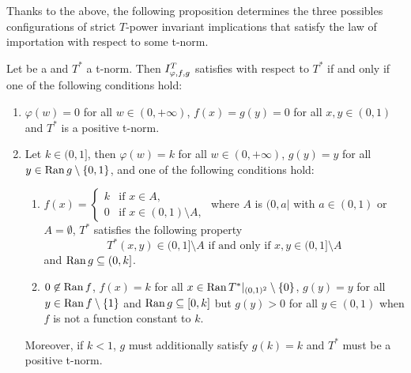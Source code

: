 Thanks to the above, the following proposition determines the three possibles configurations of strict $T$-power invariant implications that satisfy the law of importation with respect to some t-norm.
\begin{proposition}\label{prop:strict:(LI)} Let \IT be a \STP and $T^*$ a t-norm. Then $I^T_{\varphi,f,g}$ satisfies \LI with respect to $T^*$ if and only if one of the following conditions hold:
	\begin{enumerate}[label=(\roman*)]
		\item $\varphi(w)=0$ for all $w \in (0,+\infty)$, $f(x)=g(y)=0$ for all $x,y \in (0,1)$ and $T^*$ is a positive t-norm.
		\item  Let $k \in (0,1]$, then $\varphi(w)=k$ for all $w \in (0,+\infty)$, $g(y)=y$ for all $y \in \operatorname{Ran} g \setminus \{0,1\}$, and one of the following conditions hold:
		\begin{enumerate}
			\item $f(x)=\left\{ \begin{array}{ll}
				k &   \text{if }   x \in A, \\
				0 &  \text{if }   x \in (0,1)\setminus A,	\end{array}
			\right.$ where $A$ is $(0,a|$ with $ a \in (0,1)$ or $A=\emptyset$, $T^*$ satisfies the following property
			$$T^*(x,y) \in (0,1]\setminus A \text{ if and only if } x,y \in (0,1]\setminus A$$
			and $\operatorname{Ran} g \subseteq (0,k]$.
			\item $0 \not \in \operatorname{Ran} f$, $f(x)=k$ for all $x \in \operatorname{Ran} T^*|_{(0,1)^2} \setminus \{0\}$, $g(y)=y$ for all $y \in \operatorname{Ran} f \setminus \{1\}$ and $\operatorname{Ran} g \subseteq [0,k]$ but $g(y) > 0$ for all $y \in (0,1)$ when $f$ is not a function constant to $k$.
		\end{enumerate}
		Moreover, if $k < 1$, $g$ must additionally satisfy $g(k)=k$ and $T^*$ must be a positive t-norm.
	\end{enumerate}
\end{proposition}
